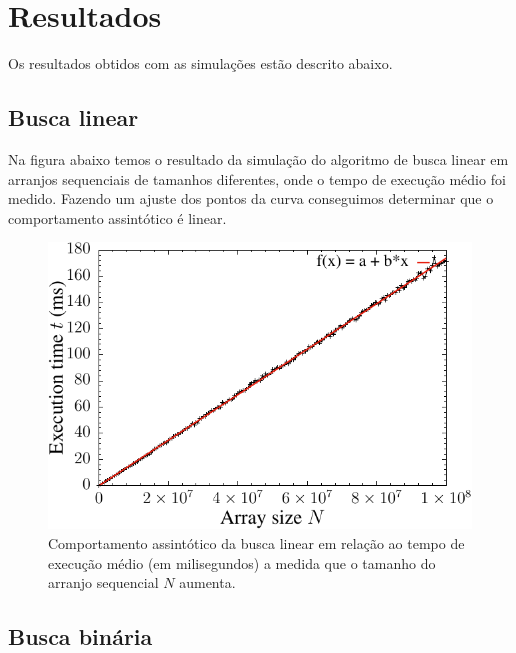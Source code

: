 \chapter{Resultados}

Os resultados obtidos com as simulações estão descrito abaixo.

\section{Busca linear}

Na figura abaixo temos o resultado da simulação do algoritmo de busca linear em arranjos sequenciais de tamanhos diferentes, onde o tempo de execução médio foi medido. Fazendo um ajuste dos pontos da curva conseguimos determinar que o comportamento assintótico é linear.
\begin{figure}[H]
  \centering
  \includegraphics[scale=1.2]{../plots/lsearch_time.pdf}
 \caption{Comportamento assintótico da busca linear em relação ao tempo de execução médio (em milisegundos) a medida que o tamanho do arranjo sequencial $N$ aumenta.}
\end{figure} \label{fig:lseach_time}


\section{Busca binária}

